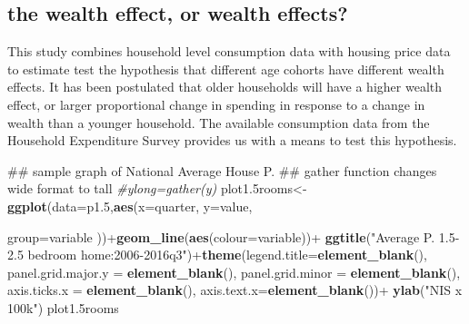 \documentclass[12pt,a4paper,]{article}
\newenvironment{Shaded}{\begin{snugshade}}{\end{snugshade}}
\newcommand{\KeywordTok}[1]{\textcolor[rgb]{0.13,0.29,0.53}{\textbf{{#1}}}}
\newcommand{\DataTypeTok}[1]{\textcolor[rgb]{0.13,0.29,0.53}{{#1}}}
\newcommand{\FloatTok}[1]{\textcolor[rgb]{0.00,0.00,0.81}{{#1}}}
\newcommand{\StringTok}[1]{\textcolor[rgb]{0.31,0.60,0.02}{{#1}}}
\newcommand{\CommentTok}[1]{\textcolor[rgb]{0.56,0.35,0.01}{\textit{{#1}}}}
\newcommand{\NormalTok}[1]{{#1}}
\begin{document}
\subsection{the wealth effect, or wealth
effects?}\label{the-wealth-effect-or-wealth-effects}

This study combines household level consumption data with housing price
data to estimate test the hypothesis that different age cohorts have
different wealth effects. It has been postulated that older households
will have a higher wealth effect, or larger proportional change in
spending in response to a change in wealth than a younger household. The
available consumption data from the Household Expenditure Survey
provides us with a means to test this hypothesis.

\begin{Shaded}
\begin{Highlighting}[]
\NormalTok{## sample graph of National Average House P.}
\NormalTok{## gather function changes wide format to tall}
\CommentTok{#ylong=gather(y)}
\NormalTok{plot1.5rooms<-}\KeywordTok{ggplot}\NormalTok{(}\DataTypeTok{data=}\NormalTok{p1}\FloatTok{.5}\NormalTok{,}\KeywordTok{aes}\NormalTok{(}\DataTypeTok{x=}\NormalTok{quarter,}
                     \DataTypeTok{y=}\NormalTok{value,}
                    
                     \DataTypeTok{group=}\NormalTok{variable}
                     \NormalTok{))+}\KeywordTok{geom_line}\NormalTok{(}\KeywordTok{aes}\NormalTok{(}\DataTypeTok{colour=}\NormalTok{variable))+}
\StringTok{                     }\KeywordTok{ggtitle}\NormalTok{(}\StringTok{"Average P. 1.5-2.5 bedroom home:2006-2016q3"}\NormalTok{)+}\KeywordTok{theme}\NormalTok{(}\DataTypeTok{legend.title=}\KeywordTok{element_blank}\NormalTok{(),}
                   \DataTypeTok{panel.grid.major.y =} \KeywordTok{element_blank}\NormalTok{(),}
                   \DataTypeTok{panel.grid.minor =} \KeywordTok{element_blank}\NormalTok{(),}
                   \DataTypeTok{axis.ticks.x =} \KeywordTok{element_blank}\NormalTok{(),}
                   \DataTypeTok{axis.text.x=}\KeywordTok{element_blank}\NormalTok{())+}\StringTok{ }\KeywordTok{ylab}\NormalTok{(}\StringTok{"NIS x 100k"}\NormalTok{)}
\NormalTok{plot1.5rooms}
\end{Highlighting}
\end{Shaded}
\end{document}
